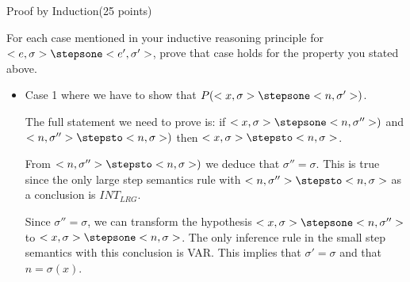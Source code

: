 \documentclass{article}
\begin{document}
\begin{question}{Proof by Induction}{(25 points)}
  \begin{subquestion}
  	
  	 For each case mentioned in your inductive reasoning principle for $<e, \sigma> \stepsone <e', \sigma'>$, prove that case
  	holds for the property you stated above. 


\begin{itemize}







\item Case 1 where we have to show that $P(<x, \sigma> \stepsone <n, \sigma'>)$.

The full statement we need to prove is: if $<x, \sigma> \stepsone <n, \sigma''>)$ and $<n, \sigma''> \stepsto <n, \sigma>)$ then $<x, \sigma> \stepsto <n, \sigma>$.


From $<n, \sigma''> \stepsto <n, \sigma>)$ we deduce that $\sigma'' = \sigma$. This is true since the only large step semantics rule with $<n, \sigma''> \stepsto <n, \sigma>$ as a conclusion is $INT_{LRG}$.

Since $\sigma'' = \sigma$, we can transform the hypothesis $<x, \sigma> \stepsone <n, \sigma''>$ to $<x, \sigma> \stepsone <n, \sigma>$. The only inference rule in the small step semantics with this conclusion is VAR. This implies that $\sigma' = \sigma$ and that $n = \sigma(x)$. 


\end{itemize}
\end{subquestion}
\end{question}
\end{document}
